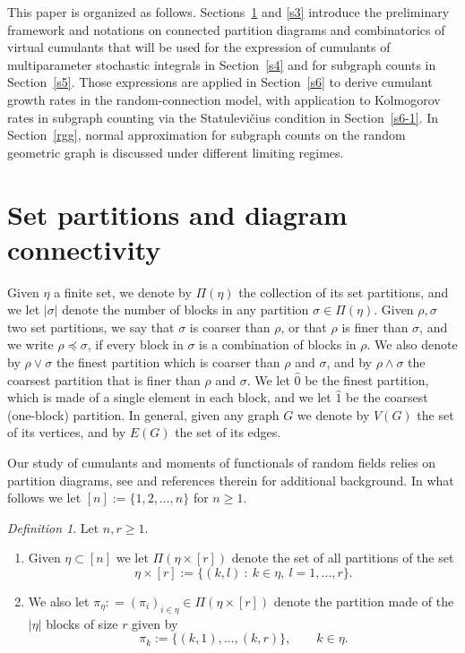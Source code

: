 \documentclass[bj,authoryear,noshowframe]{imsart}
\theoremstyle{plain}
\theoremstyle{remark}
\newtheorem{definition}[theorem]{Definition}
\begin{document}
 This paper is organized as follows.
 Sections~\ref{s2} and \ref{s3} introduce the preliminary
 framework and notations on connected partition diagrams
 and combinatorics of virtual cumulants that will be used for 
 the expression of cumulants of multiparameter stochastic integrals
 in Section~\ref{s4} and for subgraph counts in Section~\ref{s5}. 
 Those expressions are applied in Section~\ref{s6}
 to derive cumulant growth rates in the random-connection model, with application to Kolmogorov rates in subgraph counting via the {Statulevi\v{c}ius condition} in Section~\ref{s6-1}.
 In Section~\ref{rgg}, normal approximation for subgraph counts on the random geometric graph is discussed under different limiting regimes. 

 \section{Set partitions and diagram connectivity} %
 \label{s2}
 \vspace{-0.1cm}
 \noindent
 Given $\eta$ a finite set, we denote by $\Pi ( \eta )$ the collection
 of its set partitions, and we let $|\sigma|$ denote the number of blocks in any partition $\sigma \in \Pi ( \eta )$. 
 Given $\rho,\sigma$ two set partitions, we say that $\sigma$ is coarser than $\rho$,
 or that $\rho$ is finer than $\sigma$,
 and we write $\rho\preceq\sigma$,
 if every block in $\sigma$ is a combination of blocks in $\rho$. 
 We also denote by $\rho\vee\sigma$ the finest partition which is coarser than $\rho$ and $\sigma$, and by $\rho\wedge\sigma$ the coarsest partition that is finer than $\rho$ and $\sigma$.
 We let $\widehat{0}$ be the finest partition, which is made of a single element in each block, and we let $\widehat{1}$ be the coarsest (one-block) partition. 
 In general, given any graph $G$ we denote by $V(G)$ the set of its vertices, and by
 $E(G)$ the set of its edges.
 
  
 Our study of cumulants and moments of functionals of random fields
 relies on partition diagrams, see \cite{MalyshevMinlos91,khorunzhiy,peccatitaqqu}
 and references therein for additional background. 
 In what follows we let $[n]:=\{1,2,\dots,n\}$ for $n\geq 1$.
 
 \vspace{-0.2cm}
 
 \begin{definition}
   Let $n,r\geq 1$. 
 \begin{enumerate}%
 \item Given $\eta \subset [n]$ we let
 $\Pi ( \eta \times [r])$ denote the set of all partitions of the set 
  $$
  \eta \times [r] := 
  \big\{ (k,l) \ : \
  k\in \eta, \ l = 1,\ldots , r \big\}. 
 $$
 \item
   We also let 
 $\pi_\eta : = (\pi_i)_{i\in \eta} \in \Pi ( \eta \times [r])$ denote the
  partition made of the $|\eta|$ blocks
  of size $r$ given by 
  $$\pi_k := \{ (k,1), \ldots , (k,r) \}, \qquad k\in \eta. 
 $$
 \end{enumerate} 
 \end{definition}
 
\end{document}
